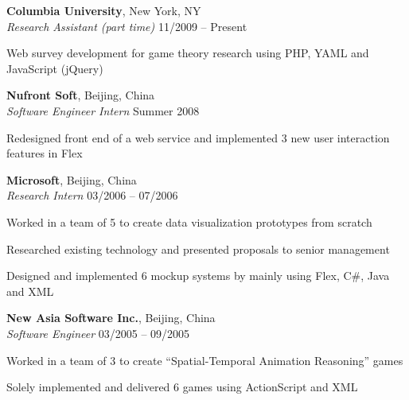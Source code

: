 \documentclass[margin,line]{resume}
\begin{document}
\begin{resume}
    \textbf{Columbia University}, New York, NY \\
    \textsl{Research Assistant (part time)} \hfill 11/2009 -- Present \vspace{-3mm}\\\vspace{-1mm}%
      \begin{list2}
      \item Web survey development for game theory research using PHP, YAML and JavaScript (jQuery) 
      \end{list2}

    \textbf{Nufront Soft}, Beijing, China \\
    \textsl{Software Engineer Intern} \hfill Summer 2008 \vspace{-3mm}\\\vspace{-1mm}%
      \begin{list2}
      \item Redesigned front end of a web service and implemented 3 new user interaction features in Flex 
      \end{list2}

    \textbf{Microsoft}, Beijing, China \\
    \textsl{Research Intern} \hfill 03/2006 -- 07/2006 \vspace{-3mm}\\\vspace{-1mm}%
      \begin{list2}
      \item Worked in a team of 5 to create data visualization prototypes from scratch 
      \item Researched existing technology and presented proposals to senior management 
      \item Designed and implemented 6 mockup systems by mainly using Flex, C\#, Java and XML 
      \end{list2}
   
    \textbf{New Asia Software Inc.}, Beijing, China \\
    \textsl{Software Engineer} \hfill 03/2005 -- 09/2005  \vspace{-3mm}\\\vspace{-1mm}%
     \begin{list2}
      \item Worked in a team of 3 to create “Spatial-Temporal Animation Reasoning” games
      \item Solely implemented and delivered 6 games using ActionScript and XML      
     \end{list2}



\end{resume}
\end{document}
